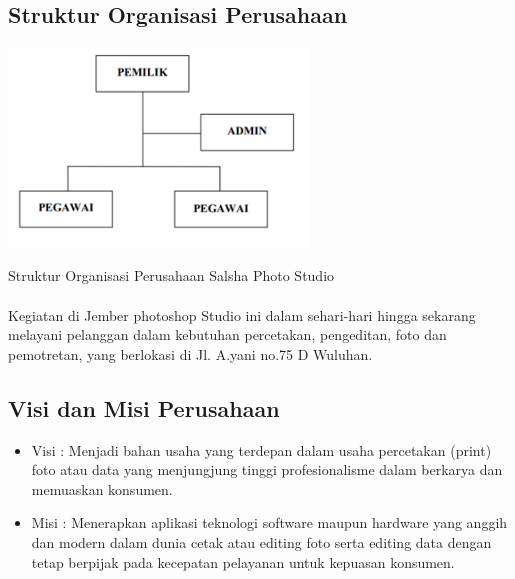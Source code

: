 \documentclass{jtetiproposalskripsi}
\begin{document}
\subsection{Struktur Organisasi Perusahaan}


\begin{table}[ht!]
  \centering
    \includegraphics[width=0.6\textwidth]{gambar/struktur}
    \caption{Struktur Organisasi Perusahaan Salsha Photo Studio}
    \label{wsn}
\end{table}
\newpage

\paragraph{}
Kegiatan di Jember photoshop Studio ini dalam sehari-hari hingga sekarang melayani pelanggan dalam kebutuhan percetakan, pengeditan, foto dan pemotretan, yang berlokasi di Jl. A.yani no.75 D Wuluhan. 


\subsection{Visi dan Misi Perusahaan}
\begin{itemize}
\item[] Visi  :  Menjadi  bahan  usaha  yang  terdepan  dalam  usaha  percetakan  (print) foto atau  data  yang  menjungjung  tinggi  profesionalisme  dalam  berkarya  dan memuaskan konsumen.
\item[]Misi  :  Menerapkan  aplikasi  teknologi  software maupun hardware yang  anggih dan  modern  dalam  dunia  cetak  atau  editing  foto  serta  editing  data  dengan tetap berpijak pada kecepatan pelayanan untuk kepuasan konsumen.
\end{itemize}
\end{document}
